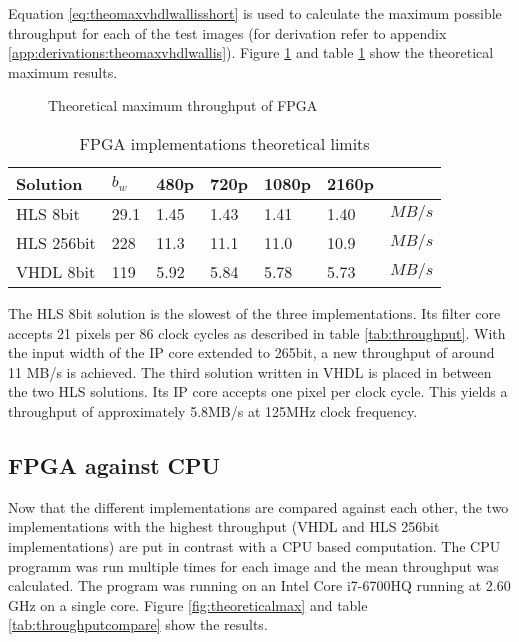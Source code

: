 Equation \ref{eq:theomaxvhdlwallisshort} is used to calculate the maximum
possible throughput for each of the test images (for derivation refer to
appendix \ref{app:derivations:theomaxvhdlwallis}). Figure \ref{fig:theoresults}
and table \ref{tab:FPGAimplementationstheoreticallimits} show the theoretical
maximum results.

\begin{figure}[b!]
    \centering
    \begin{adjustbox}{max width=\linewidth}
        
    \end{adjustbox}
    \caption{Theoretical maximum throughput of FPGA}
    \label{fig:theoresults}
\end{figure}

\begin{table}[b!]
    \centering
    \begin{tabular}{l l l l l l l}
        \toprule
        Solution & $b_w$ & 480p & 720p & 1080p & 2160p & \\
        \midrule
        HLS  8bit       & 29.1 & 1.45 & 1.43 & 1.41 & 1.40 & $MB/s$\\
        HLS  256bit     & 228  & 11.3 & 11.1 & 11.0 & 10.9 & $MB/s$\\
        VHDL 8bit          & 119  & 5.92 & 5.84 & 5.78 & 5.73 & $MB/s$\\
        \bottomrule
    \end{tabular}
    \caption{FPGA implementations theoretical limits}
    \label{tab:FPGAimplementationstheoreticallimits}
\end{table}

The HLS 8bit solution is the slowest of the three implementations. Its filter
core accepts 21 pixels per 86 clock cycles as described in table \ref{tab:throughput}. 
With the input width of the IP core extended to 265bit,
a new throughput of around 11 MB/s is achieved. The third solution written
in VHDL is placed in between the two HLS solutions. Its IP core accepts one
pixel per clock cycle. This yields a throughput of approximately 5.8MB/s at
125MHz clock frequency.

\clearpage
\subsection{FPGA against CPU}
Now that the different implementations are compared against each other, the
two implementations with the highest throughput (VHDL and HLS 256bit
implementations) are put in contrast with a CPU based computation.  The CPU
programm was run multiple times for each image and the mean throughput was
calculated. The program was running on an Intel Core i7-6700HQ running at 2.60
GHz on a single core.  Figure \ref{fig:theoreticalmax} and table
\ref{tab:throughputcompare} show the results.
\\

